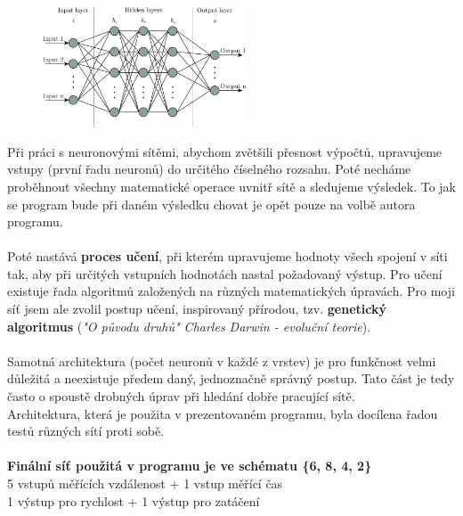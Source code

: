 \documentclass[a4paper,12pt]{article}
\newcommand{\tab}
{
    \hspace*{1em}
}
\begin{document}
        \vspace{-0.3em}
        \begin{figure}[H]
            \centering
            \includegraphics[width=0.54\textwidth]{data/nn-scheme.png}
            \label{fig:deepnn}
        \end{figure}

        Při práci s neuronovými sítěmi, abychom zvětšili přesnost výpočtů, upravujeme vstupy
        (první řadu neuronů) do určitého číselného rozsahu. Poté necháme proběhnout všechny 
        matematické operace uvnitř sítě a sledujeme výsledek. To jak se program bude při daném 
        výsledku chovat je opět pouze na volbě autora programu.\\\\
        \tab Poté nastává \textbf{proces učení}, při kterém upravujeme hodnoty všech spojení v síti tak,
        aby při určitých vstupních hodnotách nastal požadovaný výstup. Pro učení existuje řada algoritmů
        založených na různých matematických úpravách. Pro moji síť jsem ale zvolil postup učení,
        inspirovaný přírodou, tzv. \textbf{genetický algoritmus} (\textit{"O původu druhů" Charles Darwin - evoluční teorie}).\\\\
        \tab Samotná architektura (počet neuronů v každé z vrstev) je pro funkčnost velmi
        důležitá a neexistuje předem daný, jednoznačně správný postup. Tato část je tedy často o 
        spoustě drobných úprav při hledání dobře pracující sítě.\\
        \tab Architektura, která je použita v prezentovaném programu, byla docílena řadou testů
        různých sítí proti sobě.\\\\
        \textbf{Finální síť použitá v programu je ve schématu \{6, 8, 4, 2\}}\\
        5 vstupů měřících vzdálenost + 1 vstup měřící čas\\
        1 výstup pro rychlost + 1 výstup pro zatáčení
\end{document}

